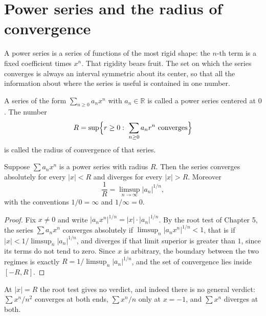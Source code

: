 \section{Power series and the radius of convergence}

A power series is a series of functions of the most rigid shape: the $n$-th term is
a fixed coefficient times $x^n$. That rigidity bears fruit. The set on which the series
converges is always an interval symmetric about its center, so that all the
information about where the series is useful is contained in one number.

\begin{definisi}
A series of the form $\sum_{n\ge0}a_nx^n$ with $a_n\in\mathbb{R}$ is called a power
series centered at $0$. The number
\[
  R=\sup\Bigl\{r\ge0:\ \sum_{n\ge0}a_nr^n\ \text{converges}\Bigr\}
\]
is called the radius of convergence of that series.
\end{definisi}



\begin{teorema}
Suppose $\sum a_nx^n$ is a power series with radius $R$. Then the series
converges absolutely for every $|x|<R$ and diverges for every $|x|>R$.
Moreover
\[
  \frac{1}{R}=\limsup_{n\to\infty}|a_n|^{1/n},
\]
with the conventions $1/0=\infty$ and $1/\infty=0$.
\end{teorema}

\begin{proof}
Fix $x\ne0$ and write $|a_nx^n|^{1/n}=|x|\cdot|a_n|^{1/n}$. By the root test
of Chapter 5, the series $\sum a_nx^n$ converges absolutely if
$\limsup_n|a_nx^n|^{1/n}<1$, that is if $|x|<1/\limsup_n|a_n|^{1/n}$, and
diverges if that limit superior is greater than $1$, since its terms do not
tend to zero. Since $x$ is arbitrary, the boundary between the two regimes is exactly
$R=1/\limsup_n|a_n|^{1/n}$, and the set of convergence lies inside $[-R,R]$.
\end{proof}

At $|x|=R$ the root test gives no verdict, and indeed there is no general
verdict: $\sum x^n/n^2$ converges at both ends, $\sum x^n/n$ only at $x=-1$, and
$\sum x^n$ diverges at both.

